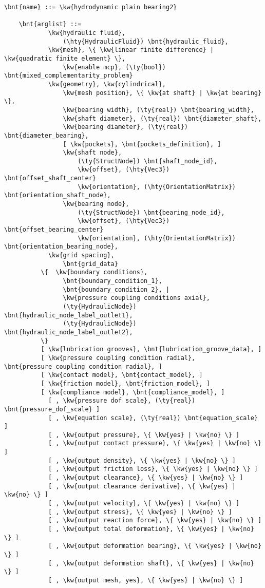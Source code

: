 \begin{Verbatim}[commandchars=\\\{\}]
    \bnt{name} ::= \kw{hydrodynamic plain bearing2}

    \bnt{arglist} ::=
            \kw{hydraulic fluid},
                (\hty{HydraulicFluid}) \bnt{hydraulic_fluid},
            \kw{mesh}, \{ \kw{linear finite difference} | \kw{quadratic finite element} \},
                \kw{enable mcp}, (\ty{bool}) \bnt{mixed_complementarity_problem}
            \kw{geometry}, \kw{cylindrical},
                \kw{mesh position}, \{ \kw{at shaft} | \kw{at bearing} \},
                \kw{bearing width}, (\ty{real}) \bnt{bearing_width},
                \kw{shaft diameter}, (\ty{real}) \bnt{diameter_shaft},
                \kw{bearing diameter}, (\ty{real}) \bnt{diameter_bearing},
                [ \kw{pockets}, \bnt{pockets_definition}, ]
                \kw{shaft node},
                    (\ty{StructNode}) \bnt{shaft_node_id},
                    \kw{offset}, (\hty{Vec3}) \bnt{offset_shaft_center}
                    \kw{orientation}, (\hty{OrientationMatrix}) \bnt{orientation_shaft_node},
                \kw{bearing node},
                    (\ty{StructNode}) \bnt{bearing_node_id},
                    \kw{offset}, (\hty{Vec3}) \bnt{offset_bearing_center}
                    \kw{orientation}, (\hty{OrientationMatrix}) \bnt{orientation_bearing_node},
            \kw{grid spacing},
                \bnt{grid_data}
          \{  \kw{boundary conditions},
                \bnt{boundary_condition_1},
                \bnt{boundary_condition_2}, |
                \kw{pressure coupling conditions axial},
                (\ty{HydraulicNode}) \bnt{hydraulic_node_label_outlet1},
                (\ty{HydraulicNode}) \bnt{hydraulic_node_label_outlet2},
          \}
          [ \kw{lubrication grooves}, \bnt{lubrication_groove_data}, ]
          [ \kw{pressure coupling condition radial}, \bnt{pressure_coupling_condition_radial}, ]
          [ \kw{contact model}, \bnt{contact_model}, ]
          [ \kw{friction model}, \bnt{friction_model}, ]
          [ \kw{compliance model}, \bnt{compliance_model}, ]
            [ , \kw{pressure dof scale}, (\ty{real}) \bnt{pressure_dof_scale} ]
            [ , \kw{equation scale}, (\ty{real}) \bnt{equation_scale} ]
            [ , \kw{output pressure}, \{ \kw{yes} | \kw{no} \} ]
            [ , \kw{output contact pressure}, \{ \kw{yes} | \kw{no} \} ]
            [ , \kw{output density}, \{ \kw{yes} | \kw{no} \} ]
            [ , \kw{output friction loss}, \{ \kw{yes} | \kw{no} \} ]
            [ , \kw{output clearance}, \{ \kw{yes} | \kw{no} \} ]
            [ , \kw{output clearance derivative}, \{ \kw{yes} | \kw{no} \} ]
            [ , \kw{output velocity}, \{ \kw{yes} | \kw{no} \} ]
            [ , \kw{output stress}, \{ \kw{yes} | \kw{no} \} ]
            [ , \kw{output reaction force}, \{ \kw{yes} | \kw{no} \} ]
            [ , \kw{output total deformation}, \{ \kw{yes} | \kw{no} \} ]
            [ , \kw{output deformation bearing}, \{ \kw{yes} | \kw{no} \} ]
            [ , \kw{output deformation shaft}, \{ \kw{yes} | \kw{no} \} ]
            [ , \kw{output mesh, yes}, \{ \kw{yes} | \kw{no} \} ]

\end{Verbatim}
